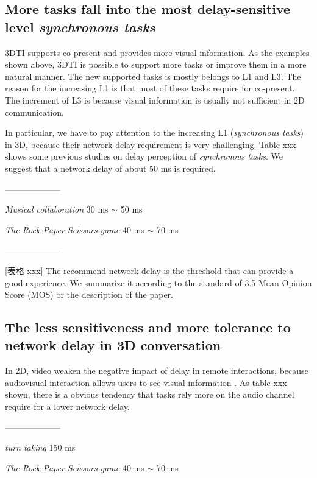 \subsection{More tasks fall into the most delay-sensitive level \emph{synchronous tasks}}

3DTI supports co-present and provides more visual information. As the examples shown above, 3DTI is possible to support more tasks or improve them in a more natural manner. The new supported tasks is mostly belongs to L1 and L3. The reason for the increasing L1 is that most of these tasks require for co-present. The increment of L3 is because visual information is usually not sufficient in 2D communication.

In particular, we have to pay attention to the increasing L1 (\emph{synchronous tasks}) in 3D, because their network delay requirement is very challenging. Table xxx shows some previous studies on delay perception of \emph{synchronous tasks}. We suggest that a network delay of about 50 ms is required.

--------------------

\emph{Musical collaboration} \cite{schuett2002effects} 30 ms $\sim$ 50 ms

\emph{The Rock-Paper-Scissors game} \cite{hashimoto2006influences} 40 ms $\sim$ 70 ms

--------------------

[表格 xxx] The recommend network delay is the threshold that can provide a good experience. We summarize it according to the standard of 3.5 Mean Opinion Score (MOS) \cite{enderes2002impact, schaefer2002subjective} or the description of the paper.

\subsection{The less sensitiveness and more tolerance to network delay in 3D conversation}

In 2D, video weaken the negative impact of delay in remote interactions, because audiovisual interaction allows users to see visual information \cite{tam2012video}. As table xxx shown, there is a obvious tendency that tasks rely more on the audio channel require for a lower network delay.

--------------------

\emph{turn taking} \cite{kitawaki1991sub} 150 ms

\emph{The Rock-Paper-Scissors game} \cite{hashimoto2006influences} 40 ms $\sim$ 70 ms

